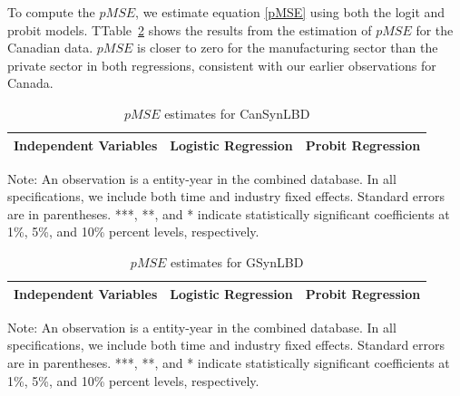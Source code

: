 To compute the $pMSE$, we estimate equation \ref{pMSE} using both the logit and probit models. TTable~\ref{tab:pMSE_regression} shows the results from the estimation of $pMSE$ for the Canadian data.
$pMSE$ is closer to zero for the manufacturing sector than the private sector in both regressions, consistent with our earlier observations for Canada.

\begin{table}[H]
  \centering
\begin{threeparttable}
 \caption{$pMSE$ estimates for CanSynLBD} \label{tab:pMSE_regression} \medskip
\renewcommand{\arraystretch}{1}
\begin{tabular}{l|c c| c c}
\toprule
\textbf{Independent Variables}&\multicolumn{2}{c|}{\textbf{Logistic Regression}} &  \multicolumn{2}{c}{\textbf{Probit Regression}}\\
\midrule

   \bottomrule
  \end{tabular} 
\begin{tablenotes}
\small
\item Note: An observation is a entity-year in the combined database. In all specifications, we include both time and industry fixed effects. Standard errors are in parentheses.  ***, **, and * indicate statistically significant coefficients at 1\%, 5\%, and 10\% percent levels, respectively.
 \end{tablenotes}
 \end{threeparttable}
\end{table}

\begin{table}[H]
  \centering
 \caption{$pMSE$ estimates for GSynLBD} \label{tab:pMSE_regression} \medskip
\renewcommand{\arraystretch}{1}
\begin{tabular}{l|c |c}
\toprule
\textbf{Independent Variables}&\textbf{Logistic Regression} &\textbf{Probit Regression}\\
\midrule

   \bottomrule
  \end{tabular} 
\begin{tablenotes}
\small
\item Note: An observation is a entity-year in the combined database. In all specifications, we include both time and industry fixed effects. Standard errors are in parentheses.  ***, **, and * indicate statistically significant coefficients at 1\%, 5\%, and 10\% percent levels, respectively.
 \end{tablenotes}
\end{table}

